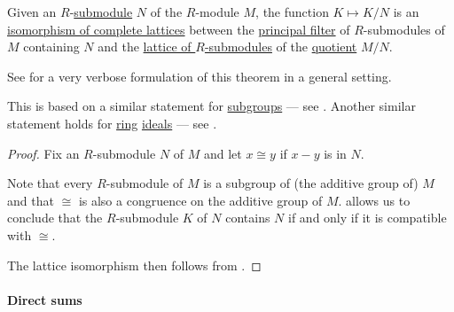 \begin{theorem}\label{thm:lattice_theorem_for_submodules}
  Given an \( R \)-\hyperref[def:module/submodel]{submodule} \( N \) of the \( R \)-module \( M \), the function \( K \mapsto K / N \) is an \hyperref[def:lattice/homomorphism]{isomorphism of complete lattices} between the \hyperref[def:lattice_ideal/principal]{principal filter} of \( R \)-submodules of \( M \) containing \( N \) and the \hyperref[thm:semiring_of_ideals/lattice]{lattice of \( R \)-submodules} of the \hyperref[def:module/quotient]{quotient} \( M / N \).
\end{theorem}
\begin{comments}
  \item See  for a very verbose formulation of this theorem in a general setting.

  \item This is based on a similar statement for \hyperref[def:group/submodel]{subgroups} --- see . Another similar statement holds for \hyperref[def:ring]{ring} \hyperref[def:semiring_ideal]{ideals} --- see .
\end{comments}
\begin{proof}
  Fix an \( R \)-submodule \( N \) of \( M \) and let \( x \cong y \) if \( x - y \) is in \( N \).

  Note that every \( R \)-submodule of \( M \) is a subgroup of (the additive group of) \( M \) and that \( {\cong} \) is also a congruence on the additive group of \( M \).  allows us to conclude that the \( R \)-submodule \( K \) of \( N \) contains \( N \) if and only if it is compatible with \( {\cong} \).

  The lattice isomorphism then follows from .
\end{proof}

\paragraph{Direct sums}

